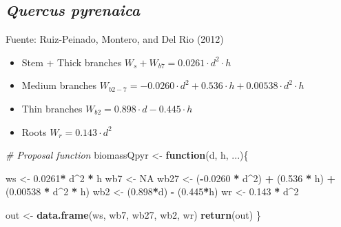 \documentclass[]{article}
\newenvironment{Shaded}{\begin{snugshade}}{\end{snugshade}}
\newcommand{\CommentTok}[1]{\textcolor[rgb]{0.56,0.35,0.01}{\textit{#1}}}
\newcommand{\ControlFlowTok}[1]{\textcolor[rgb]{0.13,0.29,0.53}{\textbf{#1}}}
\newcommand{\DecValTok}[1]{\textcolor[rgb]{0.00,0.00,0.81}{#1}}
\newcommand{\FloatTok}[1]{\textcolor[rgb]{0.00,0.00,0.81}{#1}}
\newcommand{\KeywordTok}[1]{\textcolor[rgb]{0.13,0.29,0.53}{\textbf{#1}}}
\newcommand{\NormalTok}[1]{#1}
\newcommand{\OperatorTok}[1]{\textcolor[rgb]{0.81,0.36,0.00}{\textbf{#1}}}
\newcommand{\OtherTok}[1]{\textcolor[rgb]{0.56,0.35,0.01}{#1}}
\newcommand{\StringTok}[1]{\textcolor[rgb]{0.31,0.60,0.02}{#1}}
\providecommand{\tightlist}{%
  \setlength{\itemsep}{0pt}\setlength{\parskip}{0pt}}
\begin{document}
\hypertarget{quercus-pyrenaica}{%
\subsection{\texorpdfstring{\emph{Quercus
pyrenaica}}{Quercus pyrenaica}}\label{quercus-pyrenaica}}

Fuente: Ruiz-Peinado, Montero, and Del Rio (2012)

\begin{itemize}
\tightlist
\item
  Stem + Thick branches \(W_{s} + W_{b7} = 0.0261 \cdot d^2 \cdot h\)
\item
  Medium branches
  \(W_{b2-7} = -0.0260 \cdot d^2 + 0.536 \cdot h + 0.00538 \cdot d^2 \cdot h\)
\item
  Thin branches \(W_{b2} = 0.898 \cdot d - 0.445 \cdot h\)
\item
  Roots \(W_{r} = 0.143 \cdot d^2\)
\end{itemize}

\begin{Shaded}
\begin{Highlighting}[]
\CommentTok{# Proposal function}
\NormalTok{biomassQpyr <-}\StringTok{ }\ControlFlowTok{function}\NormalTok{(d, h, ...)\{}
  
\NormalTok{  ws <-}\StringTok{ }\FloatTok{0.0261}\OperatorTok{*}\StringTok{ }\NormalTok{d}\OperatorTok{^}\DecValTok{2} \OperatorTok{*}\StringTok{ }\NormalTok{h}
\NormalTok{  wb7 <-}\StringTok{ }\OtherTok{NA} 
\NormalTok{  wb27 <-}\StringTok{ }\NormalTok{(}\OperatorTok{-}\FloatTok{0.0260} \OperatorTok{*}\StringTok{ }\NormalTok{d}\OperatorTok{^}\DecValTok{2}\NormalTok{) }\OperatorTok{+}\StringTok{ }\NormalTok{(}\FloatTok{0.536} \OperatorTok{*}\StringTok{ }\NormalTok{h) }\OperatorTok{+}\StringTok{ }\NormalTok{(}\FloatTok{0.00538} \OperatorTok{*}\StringTok{ }\NormalTok{d}\OperatorTok{^}\DecValTok{2} \OperatorTok{*}\StringTok{ }\NormalTok{h)}
\NormalTok{  wb2 <-}\StringTok{ }\NormalTok{(}\FloatTok{0.898}\OperatorTok{*}\NormalTok{d) }\OperatorTok{-}\StringTok{ }\NormalTok{(}\FloatTok{0.445}\OperatorTok{*}\NormalTok{h)}
\NormalTok{  wr <-}\StringTok{ }\FloatTok{0.143} \OperatorTok{*}\StringTok{ }\NormalTok{d}\OperatorTok{^}\DecValTok{2}
  
\NormalTok{  out <-}\StringTok{ }\KeywordTok{data.frame}\NormalTok{(ws, wb7, wb27, wb2, wr)}
  \KeywordTok{return}\NormalTok{(out)}
\NormalTok{\}}
\end{Highlighting}
\end{Shaded}
\end{document}
